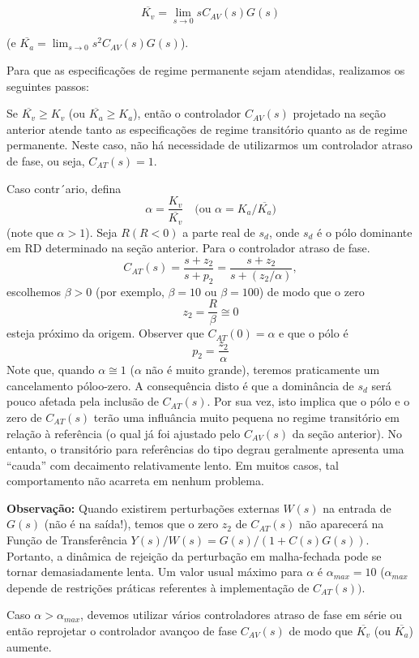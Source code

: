 \documentclass[
]{book}
\theoremstyle{definition}
\theoremstyle{definition}
\theoremstyle{definition}
\theoremstyle{remark}
\begin{document}
\[
\overline{K_v} = \lim_{s\to0}{s C_{AV}(s)G(s)}
\]

(e \(\overline{K_a} = \lim_{s\to0}{s^2C_{AV}(s)G(s)}\)).

Para que as especificações de regime permanente sejam atendidas, realizamos os seguintes passos:

Se \(\overline{K_v} \geq K_v\) (ou \(\overline{K_a} ≥ K_a\)), então o controlador \(C_{AV}(s)\) projetado na seção anterior atende tanto as especificações de regime transitório quanto as de regime permanente. Neste caso, não há necessidade de utilizarmos um controlador atraso de fase, ou seja, \(C_{AT}(s) = 1\).

Caso contr´ario, defina
\[
   \boxed{\alpha = \frac{K_v}{\overline{K_v}}} \quad \text{(ou } \alpha = K_a/\overline{K_a}\text{)}
   \]
(note que \(\alpha > 1\)). Seja \(R(R < 0)\) a parte real de \(s_d\), onde \(s_d\) é o pólo dominante em RD determinado na seção anterior. Para o controlador atraso de fase.
\[
   C_{AT}(s) = \frac{s+z_2}{s+p_2}=\frac{s+z_2}{s+(z_2/\alpha)},
   \]
escolhemos \(\beta > 0\) (por exemplo, \(\beta=10\) ou \(\beta=100\)) de modo que o zero
\[
   \boxed{z_2=\frac{R}{\beta}\cong0}
   \]
esteja próximo da origem. Observer que \(C_{AT}(0) = \alpha\) e que o pólo é
\[
   \boxed{p_2=\frac{z_2}{\alpha}}
   \]
Note que, quando \(\alpha \cong 1\) (\(\alpha\) não é muito grande), teremos praticamente um cancelamento póloo-zero. A consequência disto é que a dominância de \(s_d\) será pouco afetada pela inclusão de \(C_{AT}(s)\). Por sua vez, isto implica que o pólo e o zero de \(C_{AT}(s)\) terão uma influância muito pequena no regime transitório em relação à referência (o qual já foi ajustado pelo \(C_{AV}(s)\) da seção anterior). No entanto, o transitório para referências do tipo degrau geralmente apresenta uma ``cauda'' com decaimento relativamente lento. Em muitos casos, tal comportamento não acarreta em nenhum problema.

\textbf{Observação:} Quando existirem perturbações externas \(W(s)\) na entrada de
\(G(s)\) (não é na saída!), temos que o zero \(z_2\) de \(C_{AT}(s)\) não aparecerá na Função de Transferência \(Y(s)/W(s) = G(s)/(1 + C(s)G(s))\). Portanto, a dinâmica de rejeição da perturbação em malha-fechada pode se tornar demasiadamente lenta.
Um valor usual máximo para \(\alpha\) é \(\alpha_{max}=10\) (\(\alpha_{max}\) depende de restrições práticas referentes à implementação de \(C_{AT}(s))\).

Caso \(\alpha > \alpha_{max}\), devemos utilizar vários controladores atraso de fase em série ou então reprojetar o controlador avançoo de fase \(C_{AV}(s)\) de modo que \(\overline{K_v}\) (ou \(\overline{K_a}\)) aumente.
\end{document}

